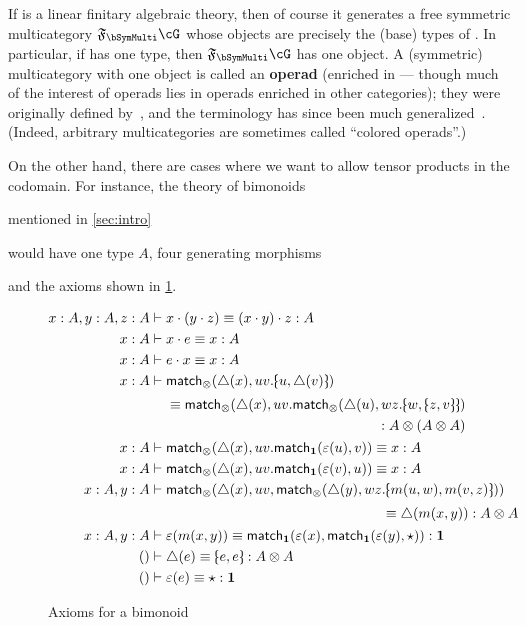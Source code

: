 If \cG is a linear finitary algebraic theory, then of course it generates a free symmetric multicategory $\F\bSymMulti\cG$ whose objects are precisely the (base) types of \cG.
In particular, if \cG has one type, then $\F\bSymMulti\cG$ has one object.
A (symmetric) multicategory with one object is called an \textbf{operad} (enriched in \bSet --- though much of the interest of operads lies in operads enriched in other categories); they were originally defined by~\cite{may:goils}, and the terminology has since been much generalized~\cite{leinster:higher-opds}.
(Indeed, arbitrary multicategories are sometimes called ``colored operads''.)

On the other hand, there are cases where we want to allow tensor products in the codomain.
For instance, the theory of bimonoids \begin{props}mentioned in \cref{sec:intro} \end{props}would have one type $A$, four generating morphisms
and the axioms shown in \cref{fig:smc-bimonoid}.

\begin{figure}
  \centering
  \begin{align*}
    x:A,y:A,z:A &\types x\cdot (y\cdot z) \equiv (x\cdot y)\cdot z :A\\
    x:A &\types x\cdot e \equiv x:A\\
    x:A &\types e\cdot x \equiv x:A\\
    x:A &\types
          \begin{multlined}[t]
            \match_\tensor(\comult(x),uv.\tpair{u}{\comult(v)})\\[\jot]
            \equiv
            \match_\tensor(\comult(x),uv.\match_\tensor(\comult(u),wz.\tpair{w}{\tpair{z}{v}})\\
            : A\tensor (A\tensor A)
          \end{multlined}\\
    x:A &\types \match_\tensor(\comult(x),uv.\match_\one(\counit(u),v)) \equiv x : A\\
    x:A &\types \match_\tensor(\comult(x),uv.\match_\one(\counit(v),u)) \equiv x : A\\
    x:A,y:A &\types
              \begin{multlined}[t]
                \match_\tensor(\comult(x),uv,\match_\tensor(\comult(y),wz.\tpair{m(u,w)}{m(v,z)}))\\[\jot]
                \equiv \comult(m(x,y)) : A\tensor A
              \end{multlined}\\
    x:A,y:A &\types \counit(m(x,y)) \equiv \match_\one(\counit(x),\match_\one(\counit(y),\ott)) :\one\\
    \ec &\types \comult(e) \equiv \tpair{e}{e} :A\tensor A\\
    \ec &\types \counit(e) \equiv \ott :\one
  \end{align*}
  \caption{Axioms for a bimonoid}
  \label{fig:smc-bimonoid}
\end{figure}

